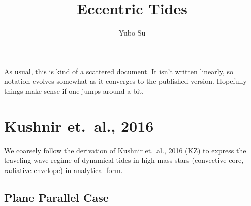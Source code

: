 \documentclass[11pt,
        usenames, %
        dvipsnames %
    ]{article}
\begin{document}
\def\Snospace~{\S{}} %
\renewcommand*{\sectionautorefname}{\Snospace}
\renewcommand*{\appendixautorefname}{\Snospace}
\renewcommand*{\figureautorefname}{Fig.}
\renewcommand*{\equationautorefname}{Eq.}
\renewcommand*{\tableautorefname}{Tab.}

\onehalfspacing

\pagestyle{fancy}
\rhead{}
\cfoot{\thepage/\pageref{LastPage}}

\title{Eccentric Tides}
\author{Yubo Su}

\maketitle

As usual, this is kind of a scattered document. It isn't written linearly, so
notation evolves somewhat as it converges to the published version. Hopefully
things make sense if one jumps around a bit.

\section{Kushnir et.\ al., 2016}

We coarsely follow the derivation of Kushnir et.\ al., 2016 (KZ) to express the
traveling wave regime of dynamical tides in high-mass stars (convective core,
radiative envelope) in analytical form.

\subsection{Plane Parallel Case}
\end{document}
